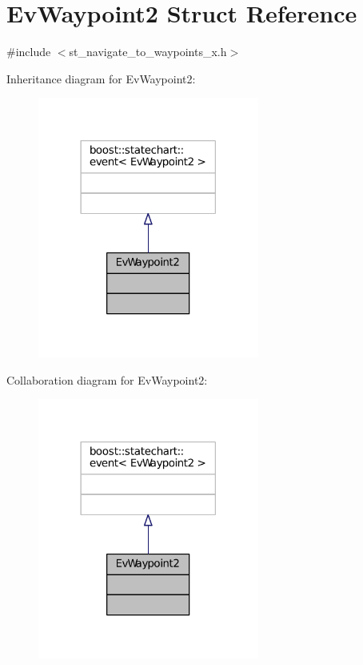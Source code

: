 \hypertarget{structEvWaypoint2}{}\section{Ev\+Waypoint2 Struct Reference}
\label{structEvWaypoint2}


{\ttfamily \#include $<$st\+\_\+navigate\+\_\+to\+\_\+waypoints\+\_\+x.\+h$>$}



Inheritance diagram for Ev\+Waypoint2\+:
\nopagebreak
\begin{figure}[H]
\begin{center}
\leavevmode
\includegraphics[width=206pt]{structEvWaypoint2__inherit__graph}
\end{center}
\end{figure}


Collaboration diagram for Ev\+Waypoint2\+:
\nopagebreak
\begin{figure}[H]
\begin{center}
\leavevmode
\includegraphics[width=206pt]{structEvWaypoint2__coll__graph}
\end{center}
\end{figure}


